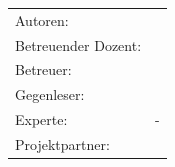 \begin{titlepage}
\vspace{11ex}
\begin{tabular}{ll} %
	Autoren:         		& \authors	\\
	Betreuender Dozent:		& \advisorprof  	\\
	Betreuer:        		& \advisor    	\\
	Gegenleser:      		& \contraprof  	\\
	Experte:      			& -  		\\
	Projektpartner:      	& \ins  		\\
\end{tabular}

\end{titlepage}

\restoregeometry %
